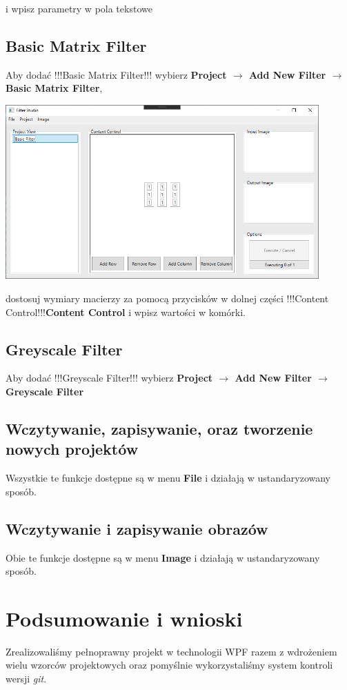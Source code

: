 \documentclass{article}
\begin{document}
i wpisz parametry w pola tekstowe

\subsection{Basic Matrix Filter}
Aby dodać !!!Basic Matrix Filter!!! wybierz \textbf{Project $\rightarrow$ Add New Filter $\rightarrow$ Basic Matrix Filter},

\bigskip
\includegraphics[width=0.9\textwidth]{matrix.png}
\bigskip

dostosuj wymiary macierzy za pomocą przycisków w dolnej części !!!Content Control!!!\textbf{Content Control} i wpisz wartości w komórki.

\subsection{Greyscale Filter}
Aby dodać !!!Greyscale Filter!!! wybierz \textbf{Project $\rightarrow$ Add New Filter $\rightarrow$ Greyscale Filter}

\subsection{Wczytywanie, zapisywanie, oraz tworzenie nowych projektów}
Wszystkie te funkcje dostępne są w menu \textbf{File} i działają w ustandaryzowany sposób.

\subsection{Wczytywanie i zapisywanie obrazów}
Obie te funkcje dostępne są w menu \textbf{Image} i działają w ustandaryzowany sposób.


\section{Podsumowanie i wnioski}
Zrealizowaliśmy pełnoprawny projekt w technologii WPF razem z wdrożeniem wielu wzorców projektowych oraz pomyślnie
wykorzystaliśmy system kontroli wersji \textit{git}.
\end{document}
